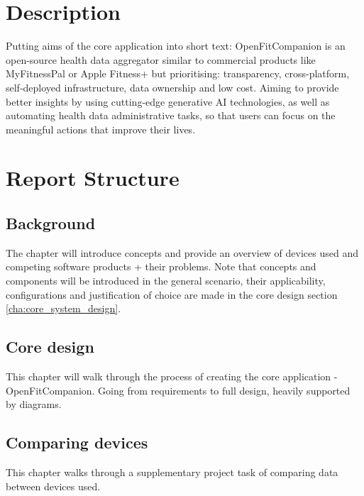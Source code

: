 \section{Description}
Putting aims of the core application into short text: OpenFitCompanion is an open-source health data aggregator similar to commercial products like MyFitnessPal or Apple Fitness+ but prioritising: transparency, cross-platform, self-deployed infrastructure, data ownership and low cost. Aiming to provide better insights by using cutting-edge generative AI technologies, as well as automating health data administrative tasks, so that users can focus on the meaningful actions that improve their lives.
\section{Report Structure}
\subsection{Background}
The chapter will introduce concepts and provide an overview of devices used and competing software products + their problems. Note that concepts and components will be introduced in the general scenario, their applicability, configurations and justification of choice are made in the core design section \ref{cha:core_system_design}.
\subsection{Core design}
This chapter will walk through the process of creating the core application - OpenFitCompanion. Going from requirements to full design, heavily supported by diagrams.
\subsection{Comparing devices}
This chapter walks through a supplementary project task of comparing data between devices used.
